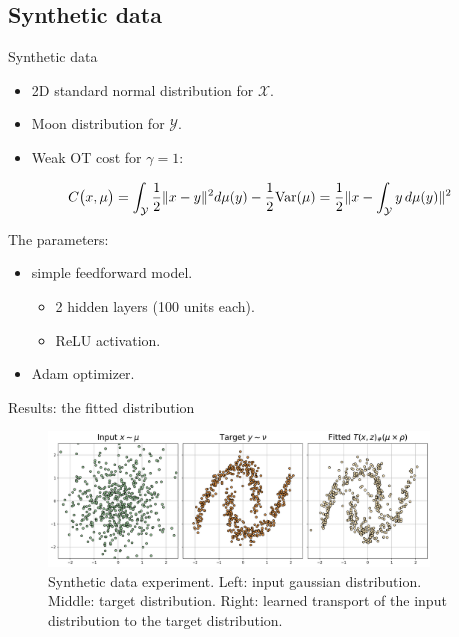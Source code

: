 \documentclass{beamer}
\begin{document}
\subsection{Synthetic data}
\begin{frame}{Synthetic data}
    \begin{itemize}
        \item 2D standard normal distribution for $\mathcal{X}$.
        \item Moon distribution for $\mathcal{Y}$.
        \item Weak OT cost for $\gamma = 1$:
    \end{itemize}
    \begin{equation}
        C\big{(}x,\mu\big{)}=\int_{\mathcal{Y}}\frac{1}{2}\|x-y\|^{2}d\mu(y)-\frac{1}{2} \text{Var}(\mu)=\frac{1}{2}\|x-\int_{\mathcal{Y}}y\,d\mu(y)\|^{2}
        \label{eq:toy_cost}
    \end{equation}

    The parameters:
    \begin{itemize}
        \item simple feedforward model.
              \begin{itemize}
                  \item 2 hidden layers (100 units each).
                  \item ReLU activation.
              \end{itemize}
        \item Adam optimizer.
    \end{itemize}
\end{frame}

\begin{frame}{Results: the fitted distribution}
    \begin{figure}[H]
        \centering
        \includegraphics[width=0.9\textwidth]{figures/toy_1.png}
        \caption{Synthetic data experiment. Left: input gaussian distribution. Middle: target distribution. Right: learned transport of the input distribution to the target distribution.}
        \label{fig:toy_1}
    \end{figure}
\end{frame}
\end{document}
